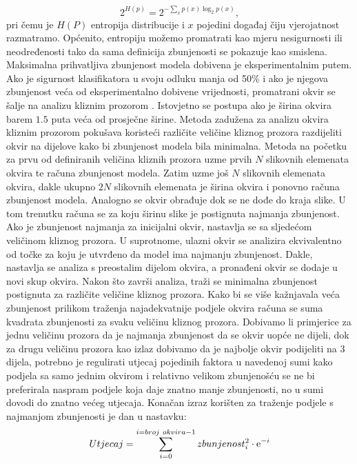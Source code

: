 \documentclass[times, utf8, diplomski]{fer}
\theoremstyle{definition}
\begin{document}
\begin{equation}
2^{H(p)} = 2 ^ {- \sum_{x}^{}p(x)\log_{2}p(x)},
\end{equation}
pri čemu je $H(P)$ entropija distribucije i $x$ pojedini događaj čiju vjerojatnost razmatramo. Općenito, entropiju možemo promatrati kao mjeru nesigurnosti ili neodređenosti tako da sama definicija zbunjenosti se pokazuje kao smislena. Maksimalna prihvatljiva zbunjenost modela dobivena je eksperimentalnim putem. Ako je sigurnost klasifikatora u svoju odluku manja od 50\% i ako je njegova zbunjenost veća od eksperimentalno dobivene vrijednosti, promatrani okvir se šalje na analizu kliznim prozorom . Istovjetno se postupa ako je širina okvira barem $1.5$ puta veća od prosječne širine.
\newline
Metoda zadužena za analizu okvira kliznim prozorom pokušava koristeći različite veličine kliznog prozora razdijeliti okvir na dijelove kako bi zbunjenost modela bila minimalna. Metoda na početku za prvu od definiranih veličina kliznih prozora uzme prvih $N$ slikovnih elemenata okvira te računa zbunjenost modela. Zatim uzme još $N$ slikovnih elemenata okvira, dakle ukupno $2N$ slikovnih elemenata je širina okvira i ponovno računa zbunjenost modela. Analogno se okvir obrađuje dok se ne dođe do kraja slike. U tom trenutku računa se za koju širinu slike je postignuta najmanja zbunjenost. Ako je zbunjenost najmanja za inicijalni okvir, nastavlja se sa sljedećom veličinom kliznog prozora. U suprotnome, ulazni okvir se analizira ekvivalentno od točke za koju je utvrđeno da model ima najmanju zbunjenost. Dakle, nastavlja se analiza s preostalim dijelom okvira, a pronađeni okvir se dodaje u novi skup okvira. Nakon što završi analiza, traži se minimalna zbunjenost postignuta za različite veličine kliznog prozora. Kako bi se više kažnjavala veća zbunjenost prilikom traženja najadekvatnije podjele okvira računa se suma kvadrata zbunjenosti za svaku veličinu kliznog prozora. Dobivamo li primjerice za jednu veličinu prozora da je najmanja zbunjenost da se okvir uopće ne dijeli, dok za drugu veličinu prozora kao izlaz dobivamo da je najbolje okvir podijeliti na 3 dijela, potrebno je regulirati utjecaj pojedinih faktora u navedenoj sumi kako podjela sa samo jednim okvirom i relativno velikom zbunjenošću se ne bi preferirala naspram podjele koja daje znatno manje zbunjenosti, no u sumi dovodi do znatno većeg utjecaja. Konačan izraz korišten za traženje podjele s najmanjom zbunjenosti je dan u nastavku:
\begin{equation}
Utjecaj = \sum_{i = 0}^{i = broj\ okvira - 1} zbunjenost_{i}^2 \cdot  {\rm e}^{-i}
\end{equation}
\end{document}
